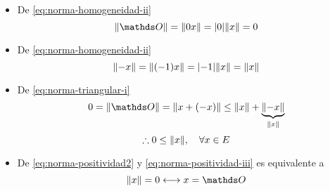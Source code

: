 \begin{itemize}
\item De \eqref{eq:norma-homogeneidad-ii} 
$$
\norm{\Ou} = \norm{0 x}=\abs{0}\norm{x} = 0
$$ 
\item De \eqref{eq:norma-homogeneidad-ii} 
$$
\norm{-x}=\norm{(-1)x}=\abs{-1}\norm{x}=\norm{x}
$$
\item De \eqref{eq:norma-triangular-i} 
$$
0 = \norm{\Ou} =\norm{x+(-x)} \leq \norm{x}+\underbrace{\norm{-x}}_{\norm{x}}
$$
\begin{equation}
	\therefore 0\leq \norm{x}, \quad \forall x \in E 
	\label{eq:norma-positividad2}
\end{equation}
\item  De \eqref{eq:norma-positividad2} y \eqref{eq:norma-positividad-iii} es equivalente a
$$
\norm{x} = 0 \longleftrightarrow x =\Ou
$$
\end{itemize}

